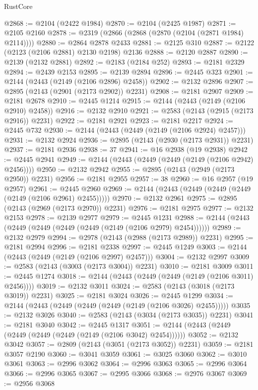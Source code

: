 \begin{lexlean}{RustCore}
\begin{coremodule}
@2868 := @2104 (@2422 @1984)
@2870 := @2104 (@2425 @1987)
@2871 := @2105 @2160
@2878 := @2319 (@2866 (@2868 (@2870 (@2104 (@2871 @1984) @2114))))
@2880 := @2864 @2878 @2433
@2881 := @2125 @310
@2887 := @2122 (@2123 (@2106 @2881) @2130 @2198) @2136
@2888 := @2120 @2887
@2890 := @2139 (@2132 @2881)
@2892 := @2183 (@2184 @252)
@2893 := @2181 @2329
@2894 := @2439 @2153
@2895 := @2139 @2894
@2896 := @2445 @323
@2901 := @2144 (@2443 (@2149 (@2106 @2896) @2458))
@2902 := @2132 @2896
@2907 := @2895 (@2143 (@2901 (@2173 @2902)) @2231)
@2908 := @2181 @2907
@2909 := @2181 @2678
@2910 := @2445 @1214
@2915 := @2144 (@2443 (@2149 (@2106 @2910) @2458))
@2916 := @2132 @2910
@2921 := @2583 (@2143 (@2915 (@2173 @2916)) @2231)
@2922 := @2181 @2921
@2923 := @2181 @2217
@2924 := @2445 @732
@2930 := @2144 (@2443 (@2449 (@2149 (@2106 @2924) @2457)))
@2931 := @2132 @2924
@2936 := @2895 (@2143 (@2930 (@2173 @2931)) @2231)
@2937 := @2181 @2936
@2938 := 37
@2941 := @16 @2938 (@19 @2938)
@2942 := @2445 @2941
@2949 := @2144 (@2443 (@2449 (@2449 (@2149 (@2106 @2942) @2456))))
@2950 := @2132 @2942
@2955 := @2895 (@2143 (@2949 (@2173 @2950)) @2231)
@2956 := @2181 @2955
@2957 := 38
@2960 := @16 @2957 (@19 @2957)
@2961 := @2445 @2960
@2969 := @2144 (@2443 (@2449 (@2449 (@2449 (@2149 (@2106 @2961) @2455)))))
@2970 := @2132 @2961
@2975 := @2895 (@2143 (@2969 (@2173 @2970)) @2231)
@2976 := @2181 @2975
@2977 := @2132 @2153
@2978 := @2139 @2977
@2979 := @2445 @1231
@2988 := @2144 (@2443 (@2449 (@2449 (@2449 (@2449 (@2149 (@2106 @2979) @2454))))))
@2989 := @2132 @2979
@2994 := @2978 (@2143 (@2988 (@2173 @2989)) @2231)
@2995 := @2181 @2994
@2996 := @2181 @2338
@2997 := @2445 @1249
@3003 := @2144 (@2443 (@2449 (@2149 (@2106 @2997) @2457)))
@3004 := @2132 @2997
@3009 := @2583 (@2143 (@3003 (@2173 @3004)) @2231)
@3010 := @2181 @3009
@3011 := @2445 @1274
@3018 := @2144 (@2443 (@2449 (@2449 (@2149 (@2106 @3011) @2456))))
@3019 := @2132 @3011
@3024 := @2583 (@2143 (@3018 (@2173 @3019)) @2231)
@3025 := @2181 @3024
@3026 := @2445 @1299
@3034 := @2144 (@2443 (@2449 (@2449 (@2449 (@2149 (@2106 @3026) @2455)))))
@3035 := @2132 @3026
@3040 := @2583 (@2143 (@3034 (@2173 @3035)) @2231)
@3041 := @2181 @3040
@3042 := @2445 @1317
@3051 := @2144 (@2443 (@2449 (@2449 (@2449 (@2449 (@2149 (@2106 @3042) @2454))))))
@3052 := @2132 @3042
@3057 := @2809 (@2143 (@3051 (@2173 @3052)) @2231)
@3059 := @2181 @3057 @2190
@3060 := @3041 @3059
@3061 := @3025 @3060
@3062 := @3010 @3061
@3063 := @2996 @3062
@3064 := @2996 @3063
@3065 := @2996 @3064
@3066 := @2996 @3065
@3067 := @2995 @3066
@3068 := @2976 @3067
@3069 := @2956 @3068

\end{coremodule}
\end{lexlean}
